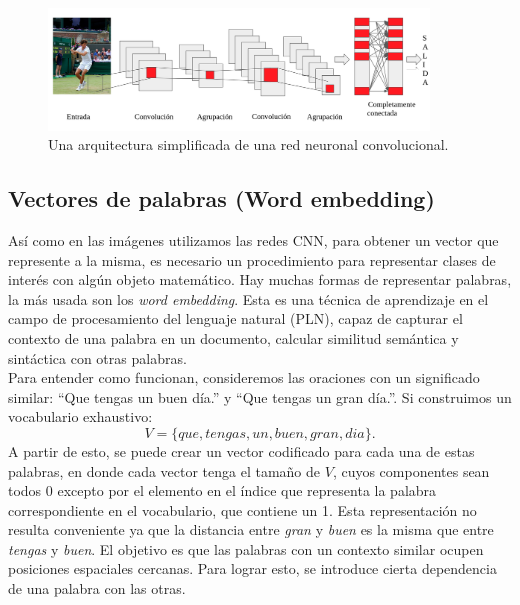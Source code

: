 \begin{figure}
	\centering
	\includegraphics[width=0.9\textwidth]{img/red_cnn.png}
	\caption{Una arquitectura simplificada de una red neuronal convolucional.}
	\label{fig:CNNEjemplo}
\end{figure}

\subsection{Vectores de palabras (Word embedding)} \label{sec:wordembedding}
Así como en las imágenes utilizamos las redes CNN, para obtener un vector que represente a la misma, es necesario un procedimiento para representar clases de interés con algún objeto matemático. Hay muchas formas de representar palabras, la más usada son los \textit{word embedding}. Esta es una técnica de aprendizaje en el campo de procesamiento del lenguaje natural (PLN), capaz de capturar el contexto de una palabra en un documento, calcular similitud semántica y sintáctica con otras palabras.\\

Para entender como funcionan, consideremos las oraciones con un significado similar: ``Que tengas un buen día.'' y ``Que tengas un gran día.''. Si construimos un vocabulario exhaustivo:
\[ V = \{que, tengas, un, buen, gran, dia\}. \]
A partir de esto, se puede crear un vector codificado para cada una de estas palabras, en donde cada vector tenga el tamaño de $V$, cuyos componentes sean todos 0 excepto por el elemento en el índice que representa la palabra correspondiente en el vocabulario, que contiene un 1. Esta representación no resulta conveniente ya que la distancia entre \textit{gran} y \textit{buen} es la misma que entre \textit{tengas} y \textit{buen}.  El objetivo es que las palabras con un contexto similar ocupen posiciones espaciales cercanas. Para lograr esto, se introduce cierta dependencia de una palabra con las otras.\\

